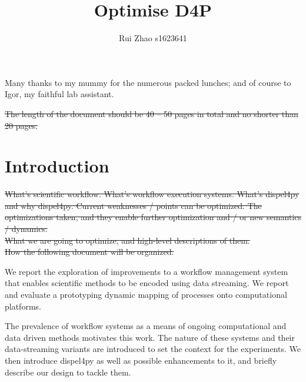 \documentclass[msc,cs,logo]{infthesis}
\title{Optimise D4P}
\author{Rui Zhao s1623641}
\begin{document}
\begin{preliminary}
\maketitle

\begin{acknowledgements}
Many thanks to my mummy for the numerous packed lunches; and of course to
Igor, my faithful lab assistant.
\end{acknowledgements}

\standarddeclaration


\tableofcontents


\end{preliminary}


%
% 

	
	\sout{The length of the document should be 40 -- 50 pages in total and no shorter than 20 pages.}
	\section{Introduction}
	\sout{What's scientific workflow. What's workflow execution systems. What's dispel4py and why dispel4py. Current weaknesses / points can be optimized. The optimizations taken, and they enable further optimization and / or new semantics / dynamics. \\
	What we are going to optimize, and high-level descriptions of them. \\
	How the following document will be organized.}
	
	We report the exploration of improvements to a workflow management system that enables scientific methods to be encoded using data streaming. We report and evaluate a prototyping dynamic mapping of processes onto computational platforms.
	
	The prevalence of workflow systems as a means of ongoing computational and data driven methods motivates this work. The nature of these systems and their data-streaming variants are introduced to set the context for the experiments. We then introduce dispel4py as well as possible enhancements to it, and briefly describe our design to tackle them.
	
\end{document}
